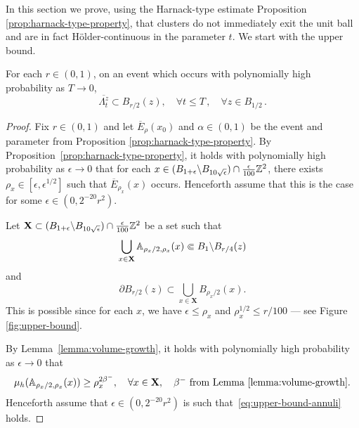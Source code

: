 \documentclass[12pt]{amsart}
\numberwithin{equation}{section}
\newcommand{\cluster}[2]{\hyperref[eq:non-co-set]{\mathit{\Lambda}^{#1}_{#2}}}
\begin{document}
	In this section we prove, using the Harnack-type estimate Proposition \ref{prop:harnack-type-property}, that clusters do not immediately exit the unit ball and are in fact H\"{o}lder-continuous in the parameter $t$. 
	We start with the upper bound. 
	
	\begin{prop} \label{prop:upper-bound-polynomially-high-prob}
		For each $r \in (0,1)$, on an event which occurs with polynomially high probability as $T \to 0$, 
		\[
		\overline{{{\cluster{z}{t}}}} \subset B_{r/2}(z) ,\quad \forall t \leq T \, , \quad \forall z \in B_{1/2} \, . 
		\] 
	\end{prop}
	
	\begin{proof}
		Fix $r \in (0,1)$ and let $\overline E_{\rho}(x_0)$ and $\alpha \in (0,1)$ be the event and parameter from Proposition \ref{prop:harnack-type-property}.
		By Proposition~\ref{prop:harnack-type-property}, it holds with polynomially high probability as $\epsilon \to 0$ that for each $x\in (B_{1 + \epsilon} \backslash B_{10 \sqrt{\epsilon}}) \cap \frac{\epsilon}{100} \mathbb{Z}^2$, there exists $\rho_x \in [\epsilon,\epsilon^{1/2}]$ such that $\overline E_{\rho_x}(x)$ occurs. Henceforth assume that this is the case for some $\epsilon \in (0, 2^{-20} r^2)$.
		
		Let $\mathbf{X} \subset  (B_{1 + \epsilon} \backslash B_{10 \sqrt{\epsilon}}) \cap \frac{\epsilon}{100} \mathbb{Z}^2$ be a set such that
		\begin{equation}
		\bigcup_{x \in \mathbf{X}} \mathbb{A}_{\rho_x/2, \rho_x}(x) \Subset B_{1} \backslash B_{r/4}(z)
		\end{equation}
		and
		\begin{equation} \label{eq:cover-inner-ball}
		\partial B_{r/2}(z) \subset \bigcup_{x \in \mathbf{X}} B_{\rho_x/2}(x).
		\end{equation}
		This is possible since for each $x$, we have $\epsilon \leq \rho_x$ and $\rho_x^{1/2} \leq r/100$ --- see Figure \ref{fig:upper-bound}. 
		
		
		By Lemma~\ref{lemma:volume-growth}, it holds with polynomially high probability as $\epsilon \to 0$ that
		\begin{equation} \label{eq:upper-bound-annuli}
		\mu_h(\mathbb{A}_{\rho_x/2,\rho_x}(x )) \geq \rho_x^{2 \beta^-}, \quad \forall x \in \mathbf{X}, \quad \mbox{$\beta^-$ from Lemma \ref{lemma:volume-growth}}.
		\end{equation}
		Henceforth assume that $\epsilon \in  (0, 2^{-20} r^2)$ is such that~\eqref{eq:upper-bound-annuli} holds.
		

\end{proof}
\end{document}
